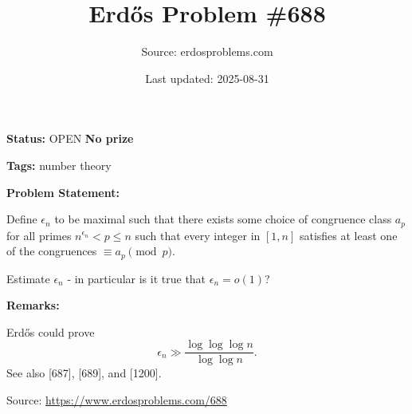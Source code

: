 \documentclass{article}
\title{Erd\H{o}s Problem \#688}
\date{Last updated: 2025-08-31}
\author{Source: erdosproblems.com}
\begin{document}
\maketitle

\noindent\textbf{Status:} OPEN \quad \textbf{No prize}

\noindent\textbf{Tags:} number theory

\medskip
\noindent\textbf{Problem Statement:}

Define $\epsilon_n$ to be maximal such that there exists some choice of congruence class $a_p$ for all primes $n^{\epsilon_n}<p\leq n$ such that every integer in $[1,n]$ satisfies at least one of the congruences $\equiv a_p\pmod{p}$.

Estimate $\epsilon_n$ - in particular is it true that $\epsilon_n=o(1)$?

\bigskip
\noindent\textbf{Remarks:}

Erd\H{o}s could prove\[\epsilon_n \gg \frac{\log\log\log n}{\log\log n}.\]See also [687], [689], and [1200].

\bigskip
\noindent\small{Source: \url{https://www.erdosproblems.com/688}}
\end{document}

